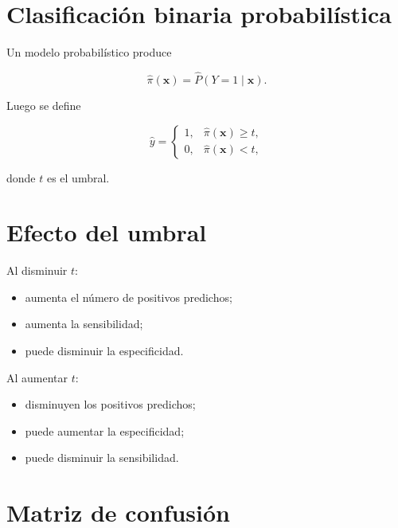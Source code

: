 \documentclass[
  spanish,
  10.5pt,
  letterpaper,
  DIV=11,
  numbers=noendperiod,
  oneside,
  open=any]{scrreprt}
\providecommand{\tightlist}{%
  \setlength{\itemsep}{0pt}\setlength{\parskip}{0pt}}
\theoremstyle{definition}
\theoremstyle{definition}
\theoremstyle{plain}
\theoremstyle{remark}
\begin{document}
\section*{Clasificación binaria
probabilística}\label{clasificaciuxf3n-binaria-probabiluxedstica}


Un modelo probabilístico produce

\[
\widehat{\pi}(\mathbf{x})
=
\widehat{P}(Y=1\mid\mathbf{x}).
\]

Luego se define

\[
\widehat{y}
=
\begin{cases}
1, & \widehat{\pi}(\mathbf{x})\geq t,\\
0, & \widehat{\pi}(\mathbf{x})<t,
\end{cases}
\]

donde \(t\) es el umbral.

\section*{Efecto del umbral}\label{efecto-del-umbral}


Al disminuir \(t\):

\begin{itemize}
\tightlist
\item
  aumenta el número de positivos predichos;
\item
  aumenta la sensibilidad;
\item
  puede disminuir la especificidad.
\end{itemize}

Al aumentar \(t\):

\begin{itemize}
\tightlist
\item
  disminuyen los positivos predichos;
\item
  puede aumentar la especificidad;
\item
  puede disminuir la sensibilidad.
\end{itemize}

\section*{Matriz de confusión}\label{matriz-de-confusiuxf3n}
\end{document}
